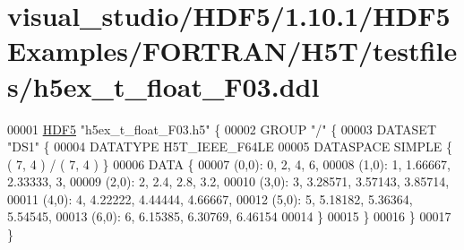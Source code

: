 \hypertarget{visual__studio_2_h_d_f5_21_810_81_2_h_d_f5_examples_2_f_o_r_t_r_a_n_2_h5_t_2testfiles_2h5ex__t__float___f03_8ddl_source}{}\section{visual\+\_\+studio/\+H\+D\+F5/1.10.1/\+H\+D\+F5\+Examples/\+F\+O\+R\+T\+R\+A\+N/\+H5\+T/testfiles/h5ex\+\_\+t\+\_\+float\+\_\+\+F03.ddl}
\label{visual__studio_2_h_d_f5_21_810_81_2_h_d_f5_examples_2_f_o_r_t_r_a_n_2_h5_t_2testfiles_2h5ex__t__float___f03_8ddl_source}

\begin{DoxyCode}
00001 \hyperlink{namespace_h_d_f5}{HDF5} \textcolor{stringliteral}{"h5ex\_t\_float\_F03.h5"} \{
00002 GROUP \textcolor{stringliteral}{"/"} \{
00003    DATASET \textcolor{stringliteral}{"DS1"} \{
00004       DATATYPE  H5T\_IEEE\_F64LE
00005       DATASPACE  SIMPLE \{ ( 7, 4 ) / ( 7, 4 ) \}
00006       DATA \{
00007       (0,0): 0, 2, 4, 6,
00008       (1,0): 1, 1.66667, 2.33333, 3,
00009       (2,0): 2, 2.4, 2.8, 3.2,
00010       (3,0): 3, 3.28571, 3.57143, 3.85714,
00011       (4,0): 4, 4.22222, 4.44444, 4.66667,
00012       (5,0): 5, 5.18182, 5.36364, 5.54545,
00013       (6,0): 6, 6.15385, 6.30769, 6.46154
00014       \}
00015    \}
00016 \}
00017 \}
\end{DoxyCode}
